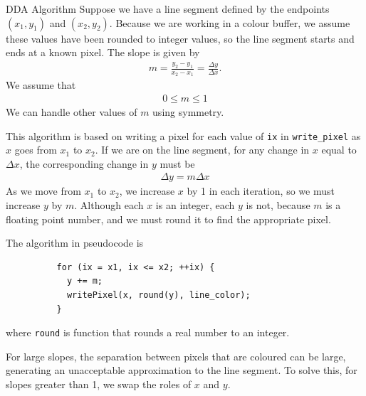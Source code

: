 \documentclass[../COS3712_Notes.tex]{subfiles}
\begin{document}
      \begin{definition}{DDA Algorithm}
        Suppose we have a line segment defined by the endpoints $(x_1, y_1)$ and $(x_2, y_2)$.
        Because we are working in a colour buffer, we assume these values have been rounded
        to integer values, so the line segment starts and ends at a known pixel.
        The slope is given by
        \begin{align*}
          m = \frac{y_2 - y_1}{x_2 - x_1} = \frac{\Delta y}{\Delta x}.
        \end{align*}
        We assume that
        \begin{align*}
          0 \leq m \leq 1
        \end{align*}
        We can handle other values of $m$ using symmetry.

        This algorithm is based on writing a pixel for each value of \texttt{ix} in
        \texttt{write\_pixel} as $x$ goes from $x_1$ to $x_2$.
        If we are on the line segment, for any change in $x$ equal to $\Delta x$,
        the corresponding change in $y$ must be
        \begin{align*}
          \Delta y = m \Delta x
        \end{align*}
        As we move from $x_1$ to $x_2$, we increase $x$ by 1 in each iteration,
        so we must increase $y$ by $m$.
        Although each $x$ is an integer, each $y$ is not, because $m$ is a floating point number,
        and we must round it to find the appropriate pixel.

        The algorithm in pseudocode is
        \begin{verbatim}
          for (ix = x1, ix <= x2; ++ix) {
            y += m;
            writePixel(x, round(y), line_color);
          }
        \end{verbatim}
        where \texttt{round} is function that rounds a real number to an integer.

        For large slopes, the separation between pixels that are coloured can be large,
        generating an unacceptable approximation to the line segment.
        To solve this, for slopes greater than 1, we swap the roles of $x$ and $y$.
      \end{definition}
\end{document}
